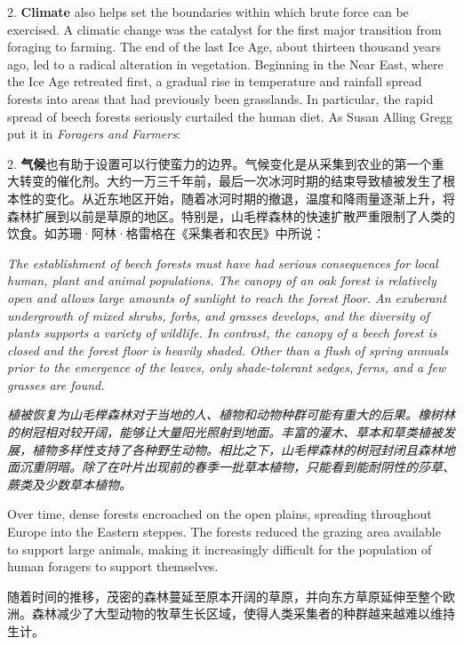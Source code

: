 \begin{Parallel}{97mm}{45mm}
  \ParallelLText
  {2. \textbf{Climate} also helps set the boundaries within which brute force can be exercised. A climatic change was the catalyst for the first major transition from foraging to farming. The end of the last Ice Age, about thirteen thousand years ago, led to a radical alteration in vegetation. Beginning in the Near East, where the Ice Age retreated first, a gradual rise in temperature and rainfall spread forests into areas that had previously been grasslands. In particular, the rapid spread of beech forests seriously curtailed the human diet. As Susan Alling Gregg put it in \emph{Foragers and Farmers}:}
  
  \ParallelRText
  {2. \textbf{气候}也有助于设置可以行使蛮力的边界。气候变化是从采集到农业的第一个重大转变的催化剂。大约一万三千年前，最后一次冰河时期的结束导致植被发生了根本性的变化。从近东地区开始，随着冰河时期的撤退，温度和降雨量逐渐上升，将森林扩展到以前是草原的地区。特别是，山毛榉森林的快速扩散严重限制了人类的饮食。如苏珊·阿林·格雷格在《采集者和农民》中所说：}
  \ParallelPar


  \ParallelLText
  {\footnotesize{\emph{The establishment of beech forests must have had serious consequences for local human, plant and animal populations. The canopy of an oak forest is relatively open and allows large amounts of sunlight to reach the forest floor. An exuberant undergrowth of mixed shrubs, forbs, and grasses develops, and the diversity of plants supports a variety of wildlife. In contrast, the canopy of a beech forest is closed and the forest floor is heavily shaded. Other than a flush of spring annuals prior to the emergence of the leaves, only shade-tolerant sedges, ferns, and a few grasses are found.}}}
  
  \ParallelRText
  {\footnotesize{\emph{植被恢复为山毛榉森林对于当地的人、植物和动物种群可能有重大的后果。橡树林的树冠相对较开阔，能够让大量阳光照射到地面。丰富的灌木、草本和草类植被发展，植物多样性支持了各种野生动物。相比之下，山毛榉森林的树冠封闭且森林地面沉重阴暗。除了在叶片出现前的春季一批草本植物，只能看到能耐阴性的莎草、蕨类及少数草本植物。}}}
  \ParallelPar



  \ParallelLText
  {Over time, dense forests encroached on the open plains, spreading throughout Europe into the Eastern steppes. The forests reduced the grazing area available to support large animals, making it increasingly difficult for the population of human foragers to support themselves.}
  
  \ParallelRText
  {随着时间的推移，茂密的森林蔓延至原本开阔的草原，并向东方草原延伸至整个欧洲。森林减少了大型动物的牧草生长区域，使得人类采集者的种群越来越难以维持生计。}
  \ParallelPar




\end{Parallel}
